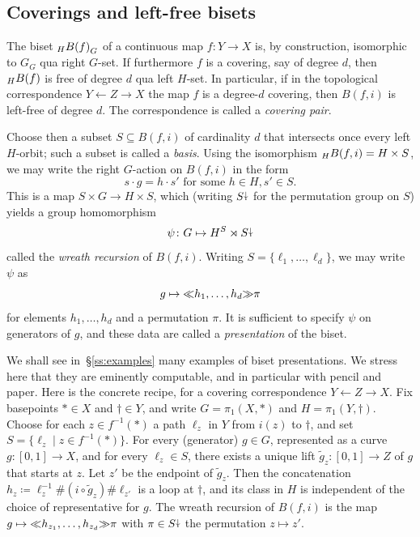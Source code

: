 \documentclass{amsart}
\begin{document}
\subsection{Coverings and left-free bisets}\label{ss:coverings}
The biset $\subscript H{B(f)}_G$ of a continuous map $f\colon Y\to X$
is, by construction, isomorphic to $G_G$ qua right $G$-set. If
furthermore $f$ is a covering, say of degree $d$, then
$\subscript H {B(f)}$ is free of degree $d$ qua left $H$-set. In
particular, if in the topological correspondence $Y\leftarrow Z\to X$
the map $f$ is a degree-$d$ covering, then $B(f,i)$ is left-free of
degree $d$. The correspondence is called a \emph{covering pair}.

Choose then a subset $S\subseteq B(f,i)$ of cardinality $d$ that
intersects once every left $H$-orbit; such a subset is called a
\emph{basis}. Using the isomorphism $\subscript H{B(f,i)}=H\times S$, we may
write the right $G$-action on $B(f,i)$ in the form
\[s\cdot g=h\cdot s'\text{ for some }h\in H,s'\in S.\]
This is a map $S\times G\to H\times S$, which (writing $S{\stackrel{\downarrow}{\smash.}}$ for
the permutation group on $S$) yields a group homomorphism
\[\psi\colon G\mapsto H^S\rtimes S{\stackrel{\downarrow}{\smash.}}\]
called the \emph{wreath recursion} of $B(f,i)$. Writing
$S=\{\ell_1,\dots,\ell_d\}$, we may write $\psi$ as
\[g\mapsto{\ll}h_1,\dots,h_d{\gg}\pi\]
for elements $h_1,\dots,h_d$ and a permutation $\pi$. It is sufficient
to specify $\psi$ on generators of $g$, and these data are called a
\emph{presentation} of the biset.

We shall see in~\S\ref{ss:examples} many examples of biset
presentations. We stress here that they are eminently computable, and
in particular with pencil and paper. Here is the concrete recipe, for
a covering correspondence $Y\leftarrow Z\to X$. Fix basepoints
$*\in X$ and $\dagger\in Y$, and write $G=\pi_1(X,*)$ and
$H=\pi_1(Y,\dagger)$. Choose for each $z\in f^{-1}(*)$ a path $\ell_z$
in $Y$ from $i(z)$ to $\dagger$, and set
$S=\{\ell_z\mid z\in f^{-1}(*)\}$.  For every (generator) $g\in G$,
represented as a curve $g\colon[0,1]\to X$, and for every
$\ell_z\in S$, there exists a unique lift $\tilde g_z\colon[0,1]\to Z$
of $g$ that starts at $z$. Let $z'$ be the endpoint of $\tilde g_z$.
Then the concatenation
$h_z\coloneqq\ell_z^{-1}\#(i\circ \tilde g_z)\#\ell_{z'}$ is a loop at
$\dagger$, and its class in $H$ is independent of the choice of
representative for $g$. The wreath recursion of $B(f,i)$ is the map
$g\mapsto{\ll}h_{z_1},\dots,h_{z_d}{\gg}\pi$ with $\pi\in S{\stackrel{\downarrow}{\smash.}}$ the
permutation $z\mapsto z'$.
\end{document}
